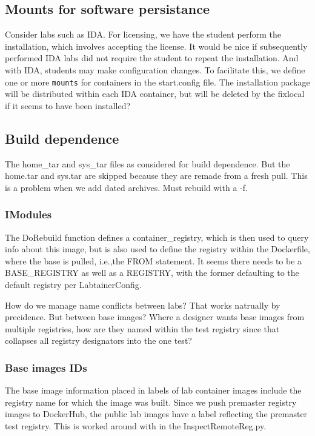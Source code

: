 \documentclass[12pt]{article}
\begin{document}
\subsection {Mounts for software persistance}
Consider labs such as IDA.  For licensing, we have the student perform the installation, which involves accepting
the license.  It would be nice if subsequently performed IDA labs did not require the student to repeat
the installation.  And with IDA, students may make configuration changes.  To facilitate this, we define
one or more {\tt mounts} for containers in the start.config file.  The installation package will be distributed
within each IDA container, but will be deleted by the fixlocal if it seems to have been installed?


\subsection {Build dependence}
The home\_tar and sys\_tar files as considered for build dependence.  But the home.tar and sys.tar are skipped because they are remade
from a fresh pull.  This is a problem when we add dated archives.  Must rebuild with a -f.
\subsubsection {IModules}
The DoRebuild function defines a container\_registry, which is then used to query info about this image, but is also used to define the
registry within the Dockerfile, where the base is pulled, i.e.,the FROM statement.  It seems there needs to be a BASE\_REGISTRY as well as
a REGISTRY, with the former defaulting to the default registry per LabtainerConfig.

How do we manage name conflicts between labs?  That works natrually by precidence.  But between base images?  Where a designer wants base
images from multiple registries, how are they named within the test registry since that collapses all registry designators into the one test?

\subsubsection {Base images IDs}
The base image information placed in labels of lab container images include the registry name for which the image was built.  Since we push
premaster registry images to DockerHub, the public lab images have a label reflecting the premaster test registry.
This is worked around with in the InspectRemoteReg.py.  
\end{document}
